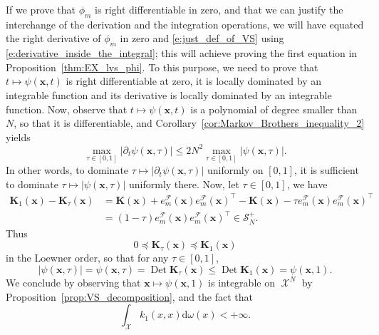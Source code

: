 \documentclass[twoside,11pt]{book}
\DeclareMathOperator{\Det}{Det}
\DeclareMathOperator{\Tran}{\intercal}
\DeclareMathOperator{\X}{\mathcal{X}}
\begin{document}
 If we prove that $\phi_{m}$ is right differentiable in zero, and that we can justify the interchange of the derivation and the integration operations, we will have equated the right derivative of $\phi_m$ in zero and \eqref{e:just_def_of_VS} using \eqref{e:derivative_inside_the_integral}; this will achieve proving the first equation in Proposition~\ref{thm:EX_lvs_phi}. To this purpose, we need to prove that $t \mapsto \psi(\bm{x},t)$ is right differentiable at zero, it is locally dominated by an integrable function and its derivative is locally dominated by an integrable function. Now, observe that $t \mapsto \psi(\bm{x},t)$ is a polynomial of degree smaller than $N$, so that it is differentiable, and Corollary~\ref{cor:Markov_Brothers_inequality_2} yields
\begin{equation}
\max_{\tau \in [0,1]} \left|\partial_t \psi(\bm{x},\tau)\right| \leq 2N^{2} \max_{\tau \in [0,1]} \left|\psi(\bm{x},\tau)\right|.
\end{equation}
 In other words, to dominate $\tau \mapsto |\partial_t \psi(\bm{x},\tau)|$ uniformly on $[0,1]$, it is sufficient to dominate $\tau \mapsto| \psi(\bm{x},\tau)|$ uniformly there. Now, let $\tau \in [0,1]$, we have
\begin{align}
\bm{K}_{1}(\bm{x}) - \bm{K}_{\tau}(\bm{x}) &  = \bm{K}(\bm{x}) + e_{m}^{\mathcal{F}}(\bm{x})e_{m}^{\mathcal{F}}(\bm{x})^{\Tran} - \bm{K}(\bm{x}) - \tau e_{m}^{\mathcal{F}}(\bm{x})e_{m}^{\mathcal{F}}(\bm{x})^{\Tran}\\
& = (1-\tau)e_{m}^{\mathcal{F}}(\bm{x})e_{m}^{\mathcal{F}}(\bm{x})^{\Tran} \in \mathcal{S}_{N}^{+}.
\end{align}
Thus
\begin{equation}
0\preceq \bm{K}_{\tau}(\bm{x}) \preceq \bm{K}_{1}(\bm{x})
\end{equation}
in the Loewner order, so that for any $\tau\in [0,1]$,
\begin{equation}
|\psi(\bm{x},\tau)| = \psi(\bm{x},\tau) =\Det \bm{K}_{\tau}(\bm{x}) \leq \Det \bm{K}_{1}(\bm{x}) = \psi(\bm{x},1) .
\end{equation}
We conclude by observing that $\bm{x} \mapsto \psi(\bm{x},1)$ is integrable on $\X^{N}$ by Proposition~\ref{prop:VS_decomposition}, and the fact that
\begin{equation}
\int_{\X} k_{1}(x,x) \mathrm{d}\omega(x) < +\infty.
\end{equation}
\end{document}
